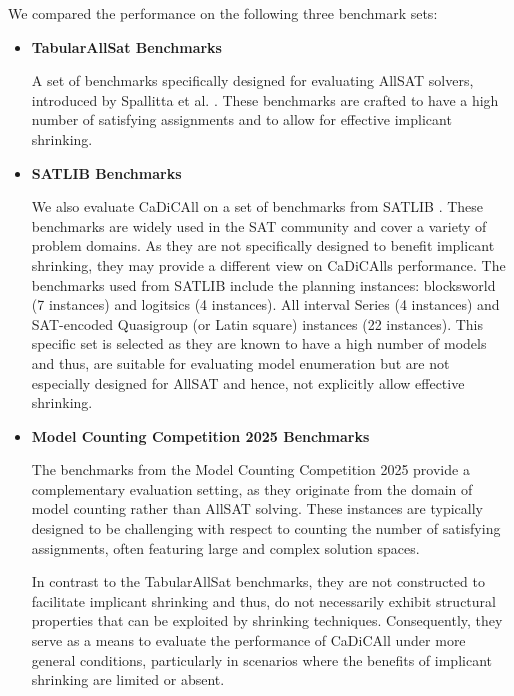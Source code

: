 \documentclass[12pt,a4paper]{article}
\begin{document}
We compared the performance on the following three benchmark sets: 

\begin{itemize}

\item \textbf{TabularAllSat Benchmarks}
    
A set of benchmarks specifically designed for evaluating AllSAT solvers, introduced by Spallitta et al. \citep{Spallitta_Sebastiani_Biere_2024}. These benchmarks are crafted to have a high number of satisfying assignments and to allow for effective implicant shrinking.

\item \textbf{SATLIB Benchmarks}

We also evaluate CaDiCAll on a set of benchmarks from SATLIB \citep{Hoos2000SATLIB}. These benchmarks are widely used in the SAT community and cover a variety of problem domains. As they are not specifically designed to benefit implicant shrinking, they may provide a different view on CaDiCAlls performance. The benchmarks used from SATLIB include the planning instances: blocksworld (7 instances) and logitsics (4 instances). All interval Series (4 instances) and SAT-encoded Quasigroup (or Latin square) instances (22 instances). This specific set is selected as they are known to have a high number of models and thus, are suitable for evaluating model enumeration but are not especially designed for AllSAT and hence, not explicitly allow effective shrinking.

\item \textbf{Model Counting Competition 2025 Benchmarks}

The benchmarks from the Model Counting Competition 2025 provide a complementary evaluation setting, as they originate from the domain of model counting rather than AllSAT solving. These instances are typically designed to be challenging with respect to counting the number of satisfying assignments, often featuring large and complex solution spaces.

In contrast to the TabularAllSat benchmarks, they are not constructed to facilitate implicant shrinking and thus, do not necessarily exhibit structural properties that can be exploited by shrinking techniques. Consequently, they serve as a means to evaluate the performance of CaDiCAll under more general conditions, particularly in scenarios where the benefits of implicant shrinking are limited or absent.

\end{itemize}
\end{document}
